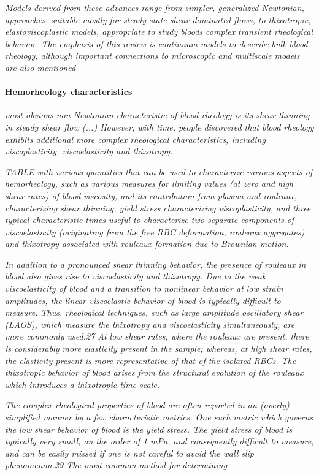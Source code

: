 \documentclass[11pt,letterpaper]{article}
\begin{document}
\textit{Models derived from these advances range from simpler, generalized Newtonian, approaches, suitable mostly for steady-state shear-dominated flows, to thixotropic, elastoviscoplastic models, appropriate to study bloods complex transient rheological behavior. The emphasis of this review is continuum models to describe bulk blood rheology, although important connections to microscopic and multiscale models are also mentioned}

\paragraph{Hemorheology characteristics}
\textit{most obvious non-Newtonian characteristic of blood rheology is its shear thinning in steady shear flow (...) However, with time, people discovered that blood rheology exhibits additional more complex rheological characteristics, including viscoplasticity, viscoelasticity and thixotropy. }

\textit{TABLE with various quantities that can be used to characterize various aspects of hemorheology, such as various measures for limiting values (at zero and high shear rates) of blood viscosity, and its contribution from plasma and rouleaux, characterizing shear thinning, yield stress characterizing viscoplasticity, and three typical characteristic times useful to characterize two separate components of viscoelasticity (originating from the free RBC deformation, rouleaux aggregates) and thixotropy associated with rouleaux formation due to Brownian motion.}

\textit{In addition to a pronounced shear thinning behavior, the
presence of rouleaux in blood also gives rise to viscoelasticity and thixotropy. Due to the weak viscoelasticity of blood and a transition to nonlinear behavior at low strain amplitudes, the linear viscoelastic behavior of blood is typically difficult to measure. Thus, rheological techniques, such as large amplitude oscillatory shear (LAOS), which measure the thixotropy and viscoelasticity simultaneously, are more commonly used.27 At low shear rates, where the rouleaux are present, there is considerably more elasticity present in the sample; whereas, at high shear rates, the elasticity present is more representative of that of the isolated RBCs. The thixotropic behavior of blood arises from the structural evolution of the rouleaux which introduces a thixotropic time scale.}

 \textit{The complex rheological properties of blood are often
reported in an (overly) simplified manner by a few characteristic metrics. One such metric which governs the low shear behavior of blood is the yield stress. The yield stress of blood is typically very small, on the order of 1 mPa, and consequently difficult to measure, and can be easily missed if one is not careful to avoid the wall slip phenomenon.29 The most common method for determining}
\end{document}
